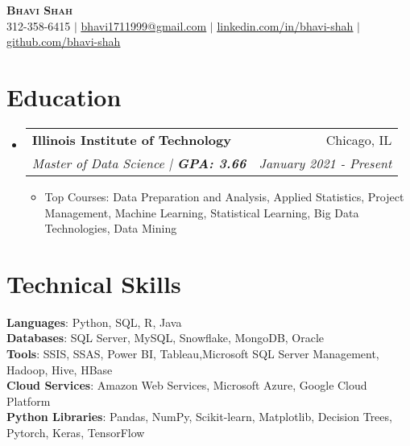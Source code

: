 \documentclass[letterpaper,11pt]{article}
\makeatletter
\newcommand{\resumeItem}[1]{
  \item\small{
    {#1 \vspace{-3pt}}
  }
}
\newcommand{\resumeSubheading}[4]{
  \vspace{-2pt}\item
    \begin{tabular*}{0.97\textwidth}[t]{l@{\extracolsep{\fill}}r}
      \textbf{#1} & #2 \\
      \textit{\small#3} & \textit{\small #4} \\
    \end{tabular*}\vspace{-7pt}
}
\newcommand{\resumeSubHeadingListStart}{\begin{itemize}[leftmargin=0.15in, label={}]}
\newcommand{\resumeSubHeadingListEnd}{\end{itemize}}
\newcommand{\resumeItemListStart}{\begin{itemize}}
\newcommand{\resumeItemListEnd}{\end{itemize}\vspace{-5pt}}
\makeatother
\begin{document}


\begin{center}
    \textbf{\Huge \scshape Bhavi Shah} \\ \vspace{1pt}
    \small 312-358-6415 $|$ \href{mailto:bhavi1711999@gmail.com }{\underline{bhavi1711999@gmail.com}} $|$ 
    \href{https://www.linkedin.com/in/bhavi--shah/}{\underline{linkedin.com/in/bhavi-shah}} $|$
    \href{https://github.com/bhavi-shah}{\underline{github.com/bhavi-shah}}
\end{center}


\section{Education}
  \resumeSubHeadingListStart
    \resumeSubheading
      {Illinois Institute of Technology }{Chicago, IL}
      {Master of Data Science |\textbf{ GPA: 3.66}}{January 2021 - Present}
          \resumeItemListStart
            \resumeItem{Top Courses: Data Preparation and Analysis, Applied Statistics, Project Management, Machine Learning, Statistical Learning, Big Data Technologies, Data Mining  }
        \resumeItemListEnd
  \resumeSubHeadingListEnd
  
\section{Technical Skills}
 \begin{itemize}[leftmargin=0.15in, label={}]
    \small{\item{
     \textbf{Languages}{: Python, SQL, R, Java} \\
     \textbf{Databases}{: SQL Server, MySQL, Snowflake, MongoDB, Oracle} \\
     \textbf{Tools}{: SSIS, SSAS, Power BI, Tableau,Microsoft SQL Server Management, Hadoop, Hive, HBase } \\
     \textbf{Cloud Services}{: Amazon Web Services, Microsoft Azure, Google Cloud Platform} \\
      \textbf{Python Libraries}{: Pandas, NumPy, Scikit-learn, Matplotlib, Decision Trees, Pytorch, Keras, TensorFlow} \\
     
    }}
 \end{itemize}


\end{document}
